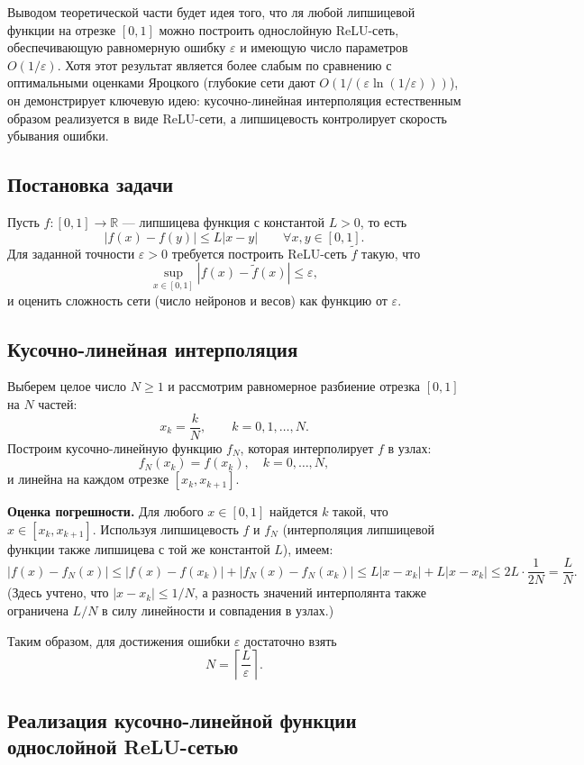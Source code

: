 \documentclass[12pt]{article}
\begin{document}
	Выводом теоретической части будет идея того, что ля любой липшицевой функции на отрезке $[0,1]$ можно построить однослойную ReLU-сеть, обеспечивающую равномерную ошибку $\varepsilon$ и имеющую число параметров $O(1/\varepsilon)$. Хотя этот результат является более слабым по сравнению с оптимальными оценками Яроцкого (глубокие сети дают $O(1/(\varepsilon\ln(1/\varepsilon)))$), он демонстрирует ключевую идею: кусочно-линейная интерполяция естественным образом реализуется в виде ReLU-сети, а липшицевость контролирует скорость убывания ошибки.
	
	\subsection{Постановка задачи}
	
	Пусть $f:[0,1]\to\mathbb{R}$ --- липшицева функция с константой $L>0$, то есть
	\[
	|f(x)-f(y)|\le L|x-y|\qquad\forall x,y\in[0,1].
	\]
	Для заданной точности $\varepsilon>0$ требуется построить ReLU-сеть $\widetilde{f}$ такую, что
	\[
	\sup_{x\in[0,1]}|f(x)-\widetilde{f}(x)|\le\varepsilon,
	\]
	и оценить сложность сети (число нейронов и весов) как функцию от $\varepsilon$.
	
	\subsection{Кусочно-линейная интерполяция}
	
	Выберем целое число $N\ge 1$ и рассмотрим равномерное разбиение отрезка $[0,1]$ на $N$ частей:
	\[
	x_k = \frac{k}{N},\qquad k=0,1,\dots,N.
	\]
	Построим кусочно-линейную функцию $f_N$, которая интерполирует $f$ в узлах:
	\[
	f_N(x_k)=f(x_k),\quad k=0,\dots,N,
	\]
	и линейна на каждом отрезке $[x_k,x_{k+1}]$.
	
	\textbf{Оценка погрешности.} Для любого $x\in[0,1]$ найдется $k$ такой, что $x\in[x_k,x_{k+1}]$. Используя липшицевость $f$ и $f_N$ (интерполяция липшицевой функции также липшицева с той же константой $L$), имеем:
	\[
	|f(x)-f_N(x)|\le |f(x)-f(x_k)| + |f_N(x)-f_N(x_k)|
	\le L|x-x_k| + L|x-x_k| \le 2L\cdot\frac{1}{2N}=\frac{L}{N}.
	\]
	(Здесь учтено, что $|x-x_k|\le 1/N$, а разность значений интерполянта также ограничена $L/N$ в силу линейности и совпадения в узлах.)
	
	Таким образом, для достижения ошибки $\varepsilon$ достаточно взять
	\[
	N = \left\lceil \frac{L}{\varepsilon} \right\rceil.
	\]
	
	\subsection{Реализация кусочно-линейной функции однослойной ReLU-сетью}
	
\end{document}
